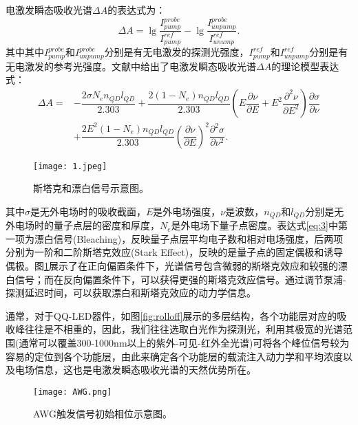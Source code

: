 电激发瞬态吸收光谱$\Delta A$的表达式为：
\begin{equation}
	\Delta A=\lg \dfrac{I^{probe}_{pump}}{I^{ref}_{pump}}-\lg \dfrac{I^{probe}_{unpump}}{I^{ref}_{unump}}.
	\label{eq:2}
\end{equation}
其中其中$I^{probe}_{pump}$和$I^{probe}_{unpump}$分别是有无电激发的探测光强度，$I^{ref}_{pump}$和$I^{ref}_{unpump}$分别是有无电激发的参考光强度。文献\cite{1025004826.nh}中给出了电激发瞬态吸收光谱$\Delta A$的理论模型表达式：
\begin{equation}
	\begin{aligned}
		\Delta A=&-\dfrac{2\sigma N_en_{QD}l_{QD}}{2.303}+\dfrac{2(1-N_e)n_{QD}l_{QD}}{2.303}\left(E\dfrac{\partial \nu}{\partial E}+E^2\dfrac{\partial^2 \nu}{\partial E^2}\right)\dfrac{\partial \sigma}{\partial \nu}\\
		&+\dfrac{2E^2(1-N_e)n_{QD}l_{QD}}{2.303}\left(\dfrac{\partial \nu}{\partial E}\right)^2\dfrac{\partial^2 \sigma}{\partial \nu^2}.
		\label{eq:3}
	\end{aligned}
\end{equation}
\begin{figure}[ht]
	\centering
	\texttt{[image: 1.jpeg]}
	\caption{斯塔克和漂白信号示意图\cite{acs.nanolett.4c03024}。}
	\label{fig:1}
\end{figure}
其中$\sigma$是无外电场时的吸收截面，$E$是外电场强度，$\nu$是波数，$n_{QD}$和$l_{QD}$分别是无外电场时的量子点层的密度和厚度，$N_e$是外电场下量子点密度。表达式\ref{eq:3}中第一项为漂白信号(Bleaching)，反映量子点层平均电子数和相对电场强度，后两项分别为一阶和二阶斯塔克效应(Stark Effect)，反映的是量子点的固定偶极和诱导偶极。图\ref{fig:1}展示了在正向偏置条件下，光谱信号包含微弱的斯塔克效应和较强的漂白信号；而在反向偏置条件下，可以获得更强的斯塔克效应信号。通过调节泵浦-探测延迟时间，可以获取漂白和斯塔克效应的动力学信息。


通常，对于QQ-LED器件，如图\ref{fig:rolloff}展示的多层结构，各个功能层对应的吸收峰往往是不相重的，因此，我们往往选取白光作为探测光，利用其极宽的光谱范围(通常可以覆盖300-1000nm以上的紫外-可见-红外全光谱)可将各个峰位信号较为容易的定位到各个功能层，由此来确定各个功能层的载流注入动力学和平均浓度以及电场信息，这也是电激发瞬态吸收光谱的天然优势所在。
\begin{figure}[ht]
	\centering
	\texttt{[image: AWG.png]}
	\caption{AWG触发信号初始相位示意图。}
	\label{fig:AWG}
\end{figure}
